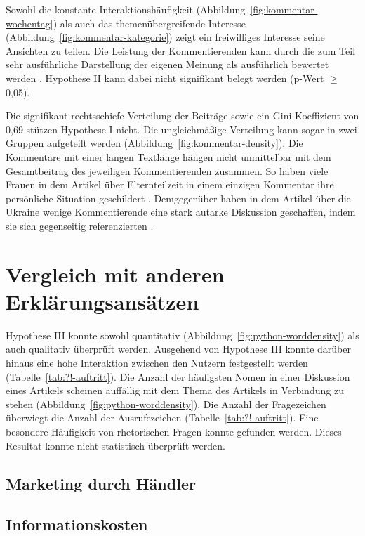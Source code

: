 \documentclass[12pt,a4paper,oneside]{article}
\begin{document}
\begin{titlepage}
\begin{flushleft}
Sowohl die konstante Interaktionshäufigkeit (Abbildung~\ref{fig:kommentar-wochentag}) als auch das themenübergreifende Interesse (Abbildung~\ref{fig:kommentar-kategorie}) zeigt ein freiwilliges Interesse seine Ansichten zu teilen. Die Leistung der Kommentierenden kann durch die zum Teil sehr ausführliche Darstellung der eigenen Meinung als ausführlich bewertet werden \cite{williams1998demography}. Hypothese II kann dabei nicht signifikant belegt werden (p-Wert $\geq$ 0,05).

Die signifikant rechtsschiefe Verteilung der Beiträge sowie ein Gini-Koeffi\-zient von 0,69 stützen Hypothese I nicht. Die ungleichmäßige Verteilung kann sogar in zwei Gruppen aufgeteilt werden (Abbildung~\ref{fig:kommentar-density}). Die Kommentare mit einer langen Textlänge hängen nicht unmittelbar mit dem Gesamtbeitrag des jeweiligen Kommentierenden zusammen. So haben viele Frauen in dem Artikel über Elternteilzeit in einem einzigen Kommentar ihre persönliche Situation geschildert \cite{Zeit-2-2014Zeit}. Demgegenüber haben in dem Artikel über die Ukraine wenige Kommentierende eine stark autarke Diskussion geschaffen, indem sie sich gegenseitig referenzierten \cite{Greven2014Zeit}.

\section{Vergleich mit anderen Erklärungsansätzen}

Hypothese III konnte sowohl quantitativ (Abbildung~\ref{fig:python-worddensity}) als auch qualitativ überprüft werden. Ausgehend von Hypothese III konnte darüber hinaus eine hohe Interaktion zwischen den Nutzern festgestellt werden (Tabelle~\ref{tab:?!-auftritt}). Die Anzahl der häufigsten Nomen in einer Diskussion eines Artikels scheinen auffällig mit dem Thema des Artikels in Verbindung zu stehen (Abbildung~\ref{fig:python-worddensity}). Die Anzahl der Fragezeichen überwiegt die Anzahl der Ausrufezeichen (Tabelle~\ref{tab:?!-auftritt}). Eine besondere Häufigkeit von rhetorischen Fragen konnte gefunden werden. Dieses Resultat konnte nicht statistisch überprüft werden.

\subsection{Marketing durch Händler}
\subsection{Informationskosten}

\end{flushleft}
\end{titlepage}
\end{document}
